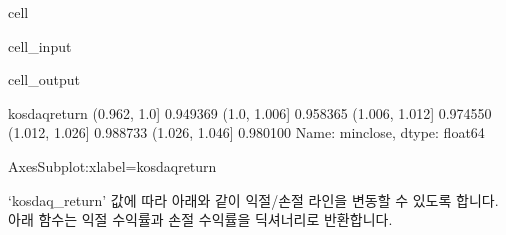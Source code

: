 \documentclass[letterpaper,10pt,english]{jupyterBook}
\begin{document}
\begin{sphinxuseclass}{cell}\begin{sphinxVerbatimInput}

\begin{sphinxuseclass}{cell_input}
\begin{sphinxVerbatim}[commandchars=\\\{\}]
  \PYG{p}{[}\PYG{p}{]} 
\PYG{p}{[}\PYG{p}{]}
\PYG{p}{[}\PYG{p}{]}
\end{sphinxVerbatim}

\end{sphinxuseclass}\end{sphinxVerbatimInput}
\begin{sphinxVerbatimOutput}

\begin{sphinxuseclass}{cell_output}
\begin{sphinxVerbatim}[commandchars=\\\{\}]
kosdaq\PYGZus{}return
(0.962, 1.0]      0.949369
(1.0, 1.006]      0.958365
(1.006, 1.012]    0.974550
(1.012, 1.026]    0.988733
(1.026, 1.046]    0.980100
Name: min\PYGZus{}close, dtype: float64
\end{sphinxVerbatim}

\begin{sphinxVerbatim}[commandchars=\\\{\}]
\PYGZlt{}AxesSubplot:xlabel=\PYGZsq{}kosdaq\PYGZus{}return\PYGZsq{}\PYGZgt{}
\end{sphinxVerbatim}

\noindent{}

\end{sphinxuseclass}\end{sphinxVerbatimOutput}

\end{sphinxuseclass}
\sphinxAtStartPar
 ‘kosdaq\_return’ 값에 따라 아래와 같이 익절/손절 라인을 변동할 수 있도록 합니다. 아래 함수는 익절 수익률과 손절 수익률을 딕셔너리로 반환합니다.
\end{document}
